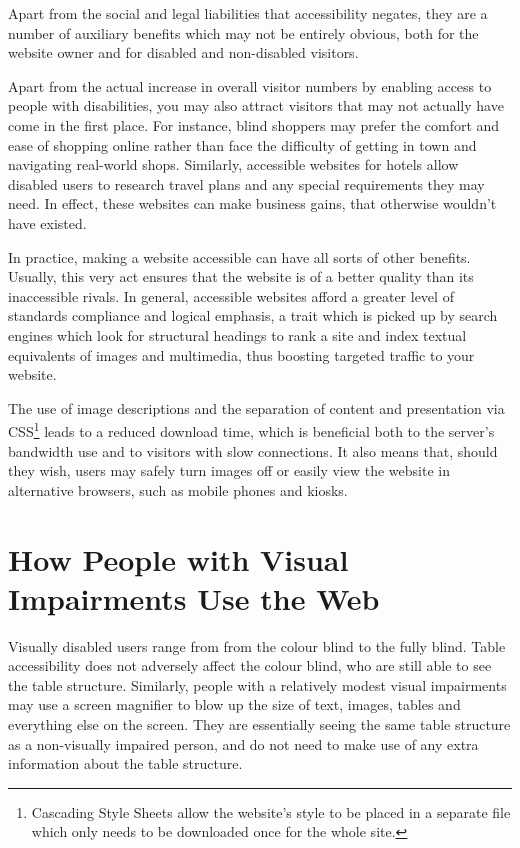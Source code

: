 Apart from the social and legal liabilities that accessibility negates, they are
a number of auxiliary benefits which may not be entirely obvious, both for the
website owner and for disabled and non-disabled visitors.

Apart from the actual increase in overall visitor numbers by enabling access to
people with disabilities, you may also attract visitors that may not actually
have come in the first place. For instance, blind shoppers may prefer the
comfort and ease of shopping online rather than face the difficulty of getting
in town and navigating real-world shops. Similarly, accessible websites for
hotels allow disabled users to research travel plans and any special
requirements they may need. In effect, these websites can make business gains,
that otherwise wouldn't have existed.

In practice, making a website accessible can have all sorts of other benefits. 
Usually, this very act ensures that the website is of a better quality than its
inaccessible rivals. In general, accessible websites afford a greater level
of standards compliance and logical emphasis, a trait which is picked up by
search engines which look for structural headings to rank a site and index
textual equivalents of images and multimedia, thus boosting targeted traffic
to your website.

The use of image descriptions and the separation of content and presentation
via CSS\footnote{Cascading Style Sheets allow the website's style to be placed
in a separate file which only needs to be downloaded once for the whole site.}
leads to a reduced download time, which is beneficial both to the server's
bandwidth use and to visitors with slow connections. It also means that, should
they wish, users may safely turn images off or easily view the website in
alternative browsers, such as mobile phones and kiosks.

\section{How People with Visual Impairments Use the Web}

Visually disabled users range from from the colour blind to the fully blind.
Table accessibility does not adversely affect the colour blind, who are still
able to see the table structure. Similarly, people with a relatively modest
visual impairments may use a screen magnifier to blow up the size of text,
images, tables and everything else on the screen. They are essentially seeing
the same table structure as a non-visually impaired person, and do not need to
make use of any extra information about the table structure.

